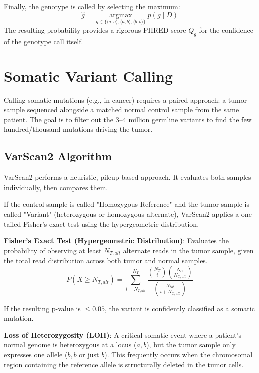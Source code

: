 \documentclass[11pt,a4paper]{article}
\newenvironment{important}{
    \vspace{1em}
    \begin{tcolorbox}[colback=blue!5!white, colframe=blue!75!black, boxrule=1pt, arc=4pt, left=10pt, right=10pt, top=10pt, bottom=10pt]
}{
    \end{tcolorbox}
    \vspace{1em}
}
\begin{document}
Finally, the genotype is called by selecting the maximum:
\[ \hat{g} = \underset{g \in \{\langle a,a \rangle, \langle a,b \rangle, \langle b,b \rangle\}}{\operatorname{argmax}} p(g \mid D) \]
The resulting probability provides a rigorous PHRED score \( Q_g \) for the confidence of the genotype call itself.

\section{Somatic Variant Calling}
Calling somatic mutations (e.g., in cancer) requires a paired approach: a tumor sample sequenced alongside a matched normal control sample from the same patient. The goal is to filter out the 3–4 million germline variants to find the few hundred/thousand mutations driving the tumor.

\subsection{VarScan2 Algorithm}
VarScan2 performs a heuristic, pileup-based approach. It evaluates both samples individually, then compares them.

If the control sample is called "Homozygous Reference" and the tumor sample is called "Variant" (heterozygous or homozygous alternate), VarScan2 applies a one-tailed Fisher's exact test using the hypergeometric distribution. 

\begin{important}
  \textbf{Fisher's Exact Test (Hypergeometric Distribution)}: Evaluates the probability of observing at least \( N_{T,alt} \) alternate reads in the tumor sample, given the total read distribution across both tumor and normal samples. 
  \[ P(X \geq N_{T,alt}) = \sum_{i = N_{T,alt}}^{N_T} \frac{\binom{N_T}{i} \binom{N_C}{N_{C,alt}}}{\binom{N_{tot}}{i + N_{C,alt}}} \]
\end{important}

If the resulting p-value is \( \leq 0.05 \), the variant is confidently classified as a somatic mutation.

\begin{important}
  \textbf{Loss of Heterozygosity (LOH)}: A critical somatic event where a patient's normal genome is heterozygous at a locus (\(a, b\)), but the tumor sample only expresses one allele (\(b, b\) or just \(b\)). This frequently occurs when the chromosomal region containing the reference allele is structurally deleted in the tumor cells.
\end{important}
\end{document}
